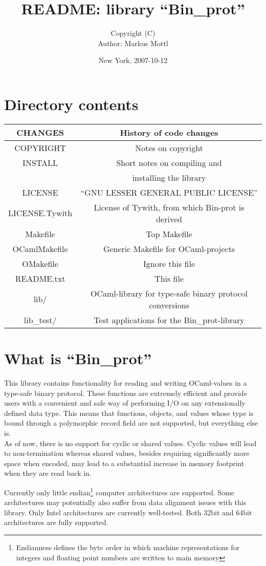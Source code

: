 \documentclass[12pt]{article}
\title{README: library ``Bin\_prot''}
\author{
  Copyright \quad (C) \quad \theyear \quad \janeshort \quad\\
  Author: Markus Mottl
}
\date{New York, 2007-10-12}
\newcommand{\trow}[2]{\quad #1 \quad&\quad #2 \quad\\}
\newcommand{\trowl}[2]{\trow{#1}{#2}\hline}
\begin{document}
\maketitle
\section{Directory contents}
\begin{center}
\begin{tabular}{|c|c|}
\hline
\trowl{CHANGES}{History of code changes}
\trowl{COPYRIGHT}{Notes on copyright}
\trow{INSTALL}{Short notes on compiling and}
\trowl{}{installing the library}
\trowl{LICENSE}{``GNU LESSER GENERAL PUBLIC LICENSE''}
\trowl{LICENSE.Tywith}{License of Tywith, from which Bin-prot is derived}
\trowl{Makefile}{Top Makefile}
\trowl{OCamlMakefile}{Generic Makefile for OCaml-projects}
\trowl{OMakefile}{Ignore this file}
\trowl{README.txt}{This file}
\trowl{lib/}{OCaml-library for type-safe binary protocol conversions}
\trowl{lib\_test/}{Test applications for the Bin\_prot-library}
\end{tabular}
\end{center}

\section{What is ``Bin\_prot''}

This library contains functionality for reading and writing OCaml-values
in a type-safe binary protocol.  These functions are extremely efficient
and provide users with a convenient and safe way of performing I/O on any
extensionally defined data type.  This means that functions, objects,
and values whose type is bound through a polymorphic record field are
not supported, but everything else is.\\

As of now, there is no support for cyclic or shared values.
Cyclic values will lead to non-termination whereas shared values,
besides requiring significantly more space when encoded, may lead to
a substantial increase in memory footprint when they are read back in.

Currently only little endian\footnote{Endianness defines the byte
order in which machine representations for integers and floating point
numbers are written to main memory} computer architectures are supported.
Some architectures may potentially also suffer from data alignment issues
with this library.  Only Intel architectures are currently well-tested.
Both 32bit and 64bit architectures are fully supported.
\end{document}
